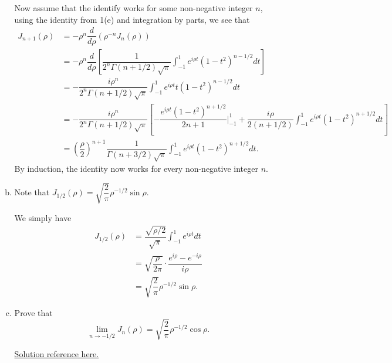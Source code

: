 \documentclass{article}
\begin{document}
\begin{enumerate}
\begin{enumerate}[(a)]
\begin{solution}
            Now assume that the identify works for some non-negative integer $n$, using the 
            identity from 1(e) and integration by parts, we see that 
            \begin{align*}
                J_{n+1}(\rho) &= -\rho^n \dfrac{d}{d\rho} (\rho^{-n} J_n(\rho))\\
                &= -\rho^n \dfrac{d}{d\rho} \left[\dfrac1{2^n \Gamma(n+1/2)\sqrt\pi} 
                    \int_{-1}^1 e^{i\rho t}(1-t^2)^{n-1/2}dt\right] \\
                &= -\dfrac{i\rho^n}{2^n\Gamma(n+1/2)\sqrt\pi} \int_{-1}^1 e^{i\rho t} t(1-t^2)^{n-1/2}dt \\
                &= -\dfrac{i\rho^n}{2^n\Gamma(n+1/2)\sqrt\pi} \left[-\dfrac{e^{i\rho t}(1-t^2)^{n+1/2}}{2n+1} \bigg|_{-1}^1
                    +\dfrac{i\rho}{2(n+1/2)} \int_{-1}^1 e^{i\rho t} (1-t^2)^{n+1/2}dt\right]\\
                &= \left(\dfrac\rho2\right)^{n+1} \dfrac1{\Gamma(n+3/2)\sqrt\pi} \int_{-1}^1 e^{i\rho t}(1-t^2)^{n+1/2}dt.
            \end{align*} 
            By induction, the identity now works for every non-negative integer $n$. 
                
        \end{solution}

        \item Note that $J_{1/2}(\rho) = \sqrt{\dfrac2\pi}\rho^{-1/2}\sin\rho$. 
        
        \begin{solution}
            We simply have
            \begin{align*}
                J_{1/2}(\rho) &= \dfrac{\sqrt{\rho/2}}{\sqrt\pi} \int_{-1}^1 e^{i\rho t} dt\\
                &= \sqrt{\dfrac\rho{2\pi}} \cdot \dfrac{e^{i\rho} - e^{-i\rho}}{i\rho}\\
                &= \sqrt{\dfrac2\pi} \rho^{-1/2}\sin\rho.
            \end{align*}
        \end{solution}

        \item Prove that 
            $$\lim_{n\to-1/2} J_n(\rho) = \sqrt{\dfrac2\pi} \rho^{-1/2} \cos\rho.$$

        \begin{solution}
            \href{https://math.stackexchange.com/questions/4376199/a-definite-integral-in-the-bessel-function-j-1-2s-from-stein-shakarchi/4376415#4376415}{Solution reference here.}


\end{solution}
\end{enumerate}
\end{enumerate}
\end{document}
